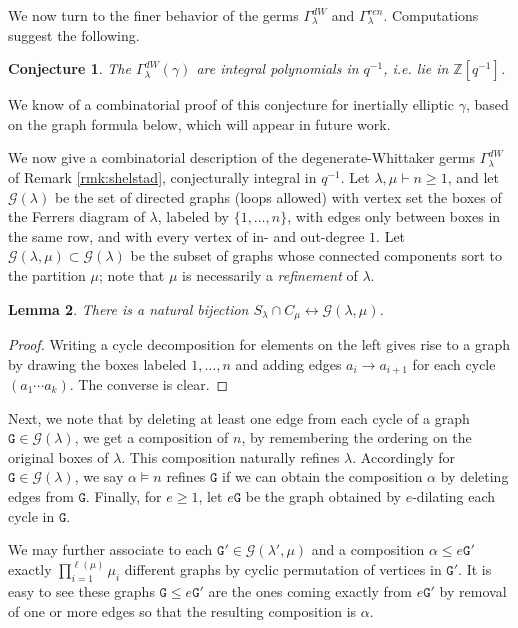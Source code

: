 \documentclass{amsart}
\numberwithin{equation}{section}
\newtheorem{lemma}{Lemma}[section]
\newtheorem{conjecture}[lemma]{Conjecture}%
\theoremstyle{definition}
\newcommand{\cG}{\mathcal{G}}
\newcommand{\Z}{{\mathbb Z}}
\begin{document}
We now turn to the finer behavior of the germs $\Gamma^{dW}_\lambda$ and $\Gamma^{ren}_\lambda$. Computations suggest the following.
\begin{conjecture}
\label{conj:dWintegrality}
    The $\Gamma^{dW}_{\lambda}(\gamma)$ are integral polynomials in $q^{-1}$, i.e. lie in $\Z[q^{-1}]$.
\end{conjecture}
We know of a combinatorial proof of this conjecture for inertially elliptic $\gamma$, based on the graph formula below, which will appear in future work.

We now give a combinatorial description of the degenerate-Whittaker germs $\Gamma^{dW}_\lambda$ of Remark \ref{rmk:shelstad}, conjecturally integral in $q^{-1}$. Let $\lambda,\mu \vdash n\geq 1$, and let $\cG(\lambda)$ be the set of directed graphs (loops allowed) with vertex set the boxes of the Ferrers diagram of $\lambda$, labeled by $\{1,\ldots, n\}$, with edges only between boxes in the same row, and with every vertex of in- and out-degree $1$. Let $\cG(\lambda,\mu)\subset \cG(\lambda)$ be the subset of graphs whose connected components sort to the partition $\mu$; note that $\mu$ is necessarily a {\em refinement} of $\lambda$.
\begin{lemma} 
There is a natural bijection
$S_\lambda\cap C_\mu\leftrightarrow \cG(\lambda,\mu)$.
\end{lemma}
\begin{proof}
Writing a cycle decomposition for elements on the left gives rise to a graph by drawing the boxes labeled $1,\ldots, n$ and adding edges $a_i\to a_{i+1}$ for each cycle $(a_1\cdots a_k)$. The converse is clear.
\end{proof}
Next, we note that by deleting at least one edge from each cycle of a graph $\mathtt{G}\in \cG(\lambda)$, we get a composition of $n$, by remembering the ordering on the original boxes of $\lambda$. This composition naturally refines $\lambda$. Accordingly for $\mathtt{G}\in \cG(\lambda)$, we say $\alpha\vDash n$ refines $\mathtt{G}$ if we can obtain the composition $\alpha$ by deleting edges from $\mathtt{G}$. Finally, for $e\geq 1$, let $e\mathtt{G}$ be the graph obtained by $e$-dilating each cycle in $\mathtt{G}$.

We may further associate to each $\mathtt{G}'\in\cG(\lambda',\mu)$ and a composition $\alpha \leq e \mathtt{G}'$ exactly $\prod_{i=1}^{\ell(\mu)}\mu_i$ different graphs by cyclic permutation of vertices in $\mathtt{G}'$. It is easy to see these graphs $\mathtt{G}\leq e \mathtt{G}'$ are the ones coming exactly from $e\mathtt{G}'$ by removal of one or more edges so that the resulting composition is $\alpha$. 
\end{document}
